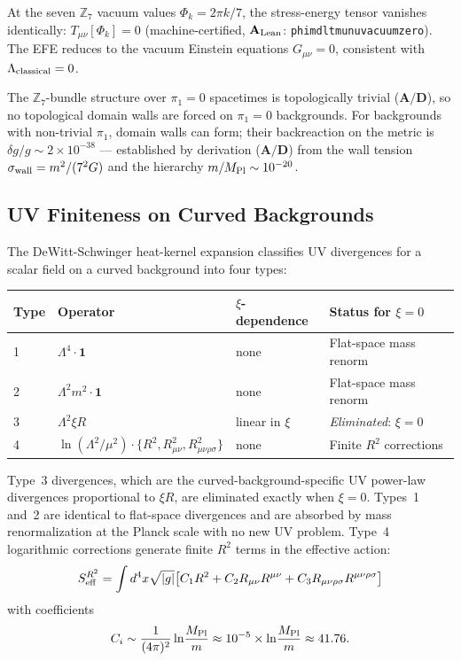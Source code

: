 \documentclass[11pt]{article}
\theoremstyle{remark}
\newcommand{\ZS}{\mathbb{Z}_7}
\newcommand{\lean}[1]{%
  \penalty-100
  \begingroup\def\_{\textunderscore\allowbreak}\texttt{#1}\endgroup}
\newcommand{\MPl}{M_{\rm Pl}}
\newcommand{\Gmunu}{G_{\mu\nu}}
\newcommand{\Tmunu}{T_{\mu\nu}}
\newcommand{\CatAL}{\ensuremath{\textbf{A}_{\rm Lean}}}
\newcommand{\CatAD}{\textbf{A/D}}
\begin{document}
At the seven $\ZS$ vacuum values $\Phi_k = 2\pi k/7$, the stress-energy tensor vanishes
identically: $\Tmunu[\Phi_k] = 0$ (machine-certified, $\CatAL$: \lean{phimdl\_tmunu\_vacuum\_zero}).
The EFE reduces to the vacuum Einstein equations $\Gmunu = 0$, consistent with
$\Lambda_{\rm classical} = 0$.

The $\ZS$-bundle structure over $\pi_1=0$ spacetimes is topologically trivial
($\CatAD$), so no topological domain
walls are forced on $\pi_1=0$ backgrounds.  For backgrounds with non-trivial $\pi_1$,
domain walls can form; their backreaction on the metric is $\delta g/g \sim 2\times10^{-38}$
--- established by derivation ($\CatAD$) from the wall tension $\sigma_{\rm wall} = m^2/(7^2 G)$
and the hierarchy $m/\MPl \sim 10^{-20}$.

\subsection{UV Finiteness on Curved Backgrounds}
\label{sec:uv}

The DeWitt-Schwinger heat-kernel expansion classifies UV divergences for a scalar field
on a curved background into four types:

\smallskip
\begin{tabular}{@{}llll@{}}
\toprule
Type & Operator & $\xi$-dependence & Status for $\xi=0$ \\
\midrule
1 & $\Lambda^4 \cdot \mathbf{1}$ & none & Flat-space mass renorm \\
2 & $\Lambda^2 m^2 \cdot \mathbf{1}$ & none & Flat-space mass renorm \\
3 & $\Lambda^2 \xi R$ & linear in $\xi$ & \emph{Eliminated}: $\xi=0$ \\
4 & $\ln(\Lambda^2/\mu^2)\cdot\{R^2,R_{\mu\nu}^2,R_{\mu\nu\rho\sigma}^2\}$ & none & Finite $R^2$ corrections \\
\bottomrule
\end{tabular}

\smallskip
Type~3 divergences, which are the curved-background-specific UV power-law divergences
proportional to $\xi R$, are eliminated exactly when $\xi=0$.  Types~1 and~2 are
identical to flat-space divergences and are absorbed by mass renormalization at the
Planck scale with no new UV problem.  Type~4 logarithmic corrections generate finite
$R^2$ terms in the effective action:
\begin{equation}
  S_{\rm eff}^{R^2} = \int d^4x\sqrt{|g|}\bigl[
    C_1 R^2 + C_2 R_{\mu\nu}R^{\mu\nu} + C_3 R_{\mu\nu\rho\sigma}R^{\mu\nu\rho\sigma}
  \bigr]
\end{equation}
with coefficients
\begin{equation}
  C_i \sim \frac{1}{(4\pi)^2}\ln\!\frac{\MPl}{m} \approx 10^{-5}\times\ln\!\frac{\MPl}{m}
  \approx 41.76.
\end{equation}
\end{document}
